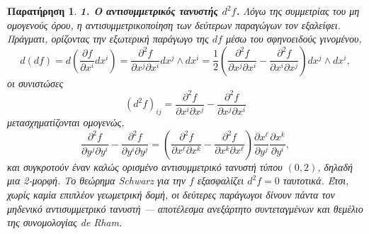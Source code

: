 \documentclass[11pt,a4paper,twoside,openright]{book}
\newtheorem{remark}[lemma]{Παρατήρηση}
\begin{document}
\begin{remark}
\textbf{1. Ο αντισυμμετρικός τανυστής \(d^2f\).} Λόγω της συμμετρίας του μη ομογενούς όρου, η αντισυμμετρικοποίηση των δεύτερων παραγώγων τον εξαλείφει. Πράγματι, ορίζοντας την εξωτερική παράγωγο της \(df\) μέσω του σφηνοειδούς γινομένου,
\begin{equation}
d(df) = d\left( \frac{\partial f}{\partial x^i} dx^i \right) = \frac{\partial^2 f}{\partial x^j \partial x^i} dx^j \wedge dx^i = \frac{1}{2} \left( \frac{\partial^2 f}{\partial x^j \partial x^i} - \frac{\partial^2 f}{\partial x^i \partial x^j} \right) dx^j \wedge dx^i,
\end{equation}
οι συνιστώσες
\begin{equation}
(d^2f)_{ij} = \frac{\partial^2 f}{\partial x^i \partial x^j} - \frac{\partial^2 f}{\partial x^j \partial x^i}
\end{equation}
μετασχηματίζονται ομογενώς,
\begin{equation}
\frac{\partial^2 f}{\partial y^j \partial y^i} - \frac{\partial^2 f}{\partial y^i \partial y^j} = \left( \frac{\partial^2 f}{\partial x^\ell \partial x^k} - \frac{\partial^2 f}{\partial x^k \partial x^\ell} \right) \frac{\partial x^\ell}{\partial y^j} \frac{\partial x^k}{\partial y^i},
\end{equation}
και συγκροτούν έναν καλώς ορισμένο αντισυμμετρικό τανυστή τύπου \((0,2)\), δηλαδή μια 2-μορφή. Το θεώρημα Schwarz για την \(f\) εξασφαλίζει \(d^2f = 0\) ταυτοτικά. Έτσι, χωρίς καμία επιπλέον γεωμετρική δομή, οι δεύτερες παράγωγοι δίνουν πάντα τον μηδενικό αντισυμμετρικό τανυστή --- αποτέλεσμα ανεξάρτητο συντεταγμένων και θεμέλιο της συνομολογίας de Rham.


\end{remark}
\end{document}
